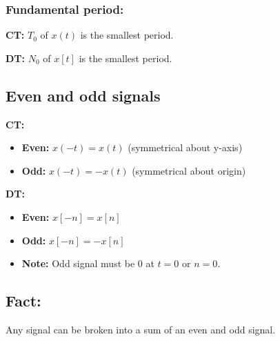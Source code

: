     \subsubsection{Fundamental period:}
    \begin{definition}
        
        \textbf{CT:} $T_0$ of $x(t)$ is the smallest period.
        \vspace{1em}

        \textbf{DT:} $N_0$ of $x[t]$ is the smallest period.
    \end{definition}

\subsection{Even and odd signals}
\begin{definition}
    
    \textbf{CT:} 
    \begin{itemize}
        \item \textbf{Even:} $x(-t) = x(t)$ (symmetrical about y-axis)
        \item \textbf{Odd:} $x(-t) = - x(t)$ (symmetrical about origin)
    \end{itemize}

    \textbf{DT:} 
    \begin{itemize}
        \item \textbf{Even:} $x[-n] = x[n]$ 
        \item \textbf{Odd:} $x[-n] = - x[n]$ 
    \end{itemize}
    \vspace{1em}

    \begin{itemize}
        \item \textbf{Note:} Odd signal must be $0$ at $t=0$ or $n=0$.
    \end{itemize}
\end{definition}

\subsection{Fact:}
\begin{definition}
    Any signal can be broken into a sum of an even and odd signal.
\end{definition}
